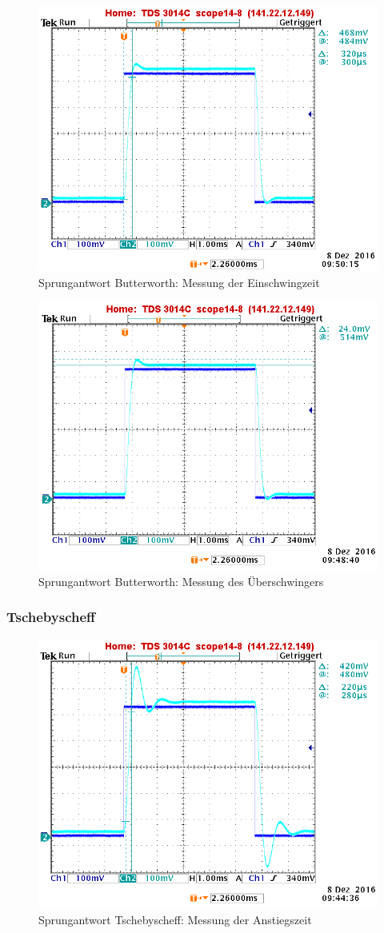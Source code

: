 \begin{figure}[h]
	\centering
	\includegraphics[width=0.60\linewidth]{Bilder/ImLabor/Sprungantwort_5_7_Butter_Einschwingzeit}
	\caption{Sprungantwort Butterworth: Messung der Einschwingzeit}
	\label{fig:Sprungantwort_5_7_Butter_Einschwingzeit}
\end{figure}

\begin{figure}[h]
	\centering
	\includegraphics[width=0.60\linewidth]{Bilder/ImLabor/Sprungantwort_5_6_Butter_Ueberschwinger}
	\caption{Sprungantwort Butterworth: Messung des Überschwingers}
	\label{fig:Sprungantwort_5_6_Butter_Ueberschwinger}
\end{figure}

\newpage

\subsubsection{Tschebyscheff}

\begin{figure}[h]
	\centering
	\includegraphics[width=0.60\linewidth]{Bilder/ImLabor/Sprungantwort_5_3_Tscheby_Anstiegszeit}
	\caption{Sprungantwort Tschebyscheff: Messung der Anstiegszeit}
	\label{fig:Sprungantwort_5_3_Tscheby_Anstiegszeit_Anhang}
\end{figure}

